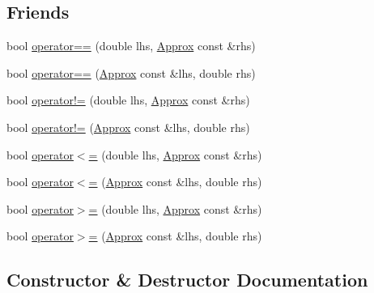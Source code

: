 \subsection*{Friends}
\begin{DoxyCompactItemize}
\item 
bool \mbox{\hyperlink{class_catch_1_1_detail_1_1_approx_ac766f044f1c63f0c5997982baefd9049}{operator==}} (double lhs, \mbox{\hyperlink{class_catch_1_1_detail_1_1_approx}{Approx}} const \&rhs)
\item 
bool \mbox{\hyperlink{class_catch_1_1_detail_1_1_approx_a35999631e6cef569f9da9f3fa910db22}{operator==}} (\mbox{\hyperlink{class_catch_1_1_detail_1_1_approx}{Approx}} const \&lhs, double rhs)
\item 
bool \mbox{\hyperlink{class_catch_1_1_detail_1_1_approx_a83b3763569a7ecc143c335b630be0e47}{operator!=}} (double lhs, \mbox{\hyperlink{class_catch_1_1_detail_1_1_approx}{Approx}} const \&rhs)
\item 
bool \mbox{\hyperlink{class_catch_1_1_detail_1_1_approx_a7497ef839f8026cc0edd6269a80f3e09}{operator!=}} (\mbox{\hyperlink{class_catch_1_1_detail_1_1_approx}{Approx}} const \&lhs, double rhs)
\item 
bool \mbox{\hyperlink{class_catch_1_1_detail_1_1_approx_aa2bfad80c8c138eac1f0b56910a7d3f2}{operator$<$=}} (double lhs, \mbox{\hyperlink{class_catch_1_1_detail_1_1_approx}{Approx}} const \&rhs)
\item 
bool \mbox{\hyperlink{class_catch_1_1_detail_1_1_approx_a75c9382b61421ffab3559c3506182d8f}{operator$<$=}} (\mbox{\hyperlink{class_catch_1_1_detail_1_1_approx}{Approx}} const \&lhs, double rhs)
\item 
bool \mbox{\hyperlink{class_catch_1_1_detail_1_1_approx_a4e60095c615a0e6bdd6e8663cd24090b}{operator$>$=}} (double lhs, \mbox{\hyperlink{class_catch_1_1_detail_1_1_approx}{Approx}} const \&rhs)
\item 
bool \mbox{\hyperlink{class_catch_1_1_detail_1_1_approx_adaba11ee9aabb4d51d4855f09aa7f7df}{operator$>$=}} (\mbox{\hyperlink{class_catch_1_1_detail_1_1_approx}{Approx}} const \&lhs, double rhs)
\end{DoxyCompactItemize}


\subsection{Constructor \& Destructor Documentation}
\mbox{\label{class_catch_1_1_detail_1_1_approx_a1a8618ea8db08c66bd3d9fe8f74b957a}} 
